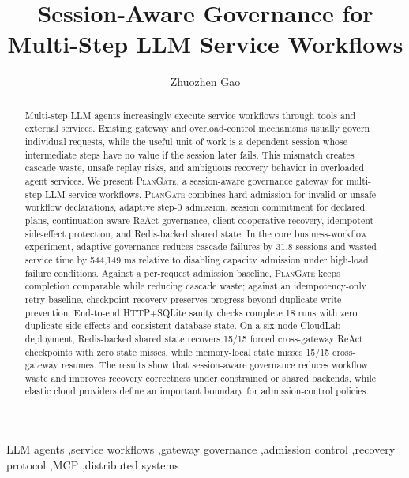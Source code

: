 \documentclass[5p,times]{elsarticle}
\newcommand{\plangate}{\textsc{PlanGate}\xspace}
\begin{document}
\begin{frontmatter}

\title{Session-Aware Governance for Multi-Step LLM Service Workflows}

\author[inst1]{Zhuozhen Gao}


\begin{abstract}
Multi-step LLM agents increasingly execute service workflows through tools and external services. Existing gateway and overload-control mechanisms usually govern individual requests, while the useful unit of work is a dependent session whose intermediate steps have no value if the session later fails. This mismatch creates cascade waste, unsafe replay risks, and ambiguous recovery behavior in overloaded agent services. We present \plangate, a session-aware governance gateway for multi-step LLM service workflows. \plangate combines hard admission for invalid or unsafe workflow declarations, adaptive step-0 admission, session commitment for declared plans, continuation-aware ReAct governance, client-cooperative recovery, idempotent side-effect protection, and Redis-backed shared state. In the core business-workflow experiment, adaptive governance reduces cascade failures by 31.8 sessions and wasted service time by 544,149 ms relative to disabling capacity admission under high-load failure conditions. Against a per-request admission baseline, \plangate keeps completion comparable while reducing cascade waste; against an idempotency-only retry baseline, checkpoint recovery preserves progress beyond duplicate-write prevention. End-to-end HTTP+SQLite sanity checks complete 18 runs with zero duplicate side effects and consistent database state. On a six-node CloudLab deployment, Redis-backed shared state recovers 15/15 forced cross-gateway ReAct checkpoints with zero state misses, while memory-local state misses 15/15 cross-gateway resumes. The results show that session-aware governance reduces workflow waste and improves recovery correctness under constrained or shared backends, while elastic cloud providers define an important boundary for admission-control policies.
\end{abstract}

\begin{keyword}
LLM agents \sep service workflows \sep gateway governance \sep admission control \sep recovery protocol \sep MCP \sep distributed systems
\end{keyword}

\end{frontmatter}
\end{document}
